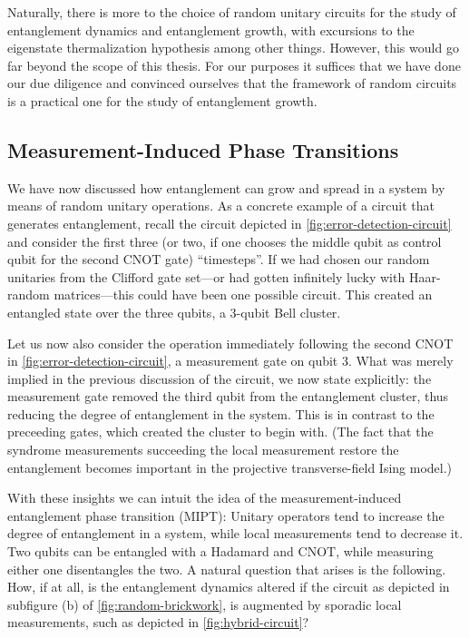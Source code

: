 Naturally, there is more to the choice of random unitary circuits for the study
of entanglement dynamics and entanglement growth, with excursions to the
eigenstate thermalization hypothesis among other things. However, this would go
far beyond the scope of this thesis. For our purposes it suffices that we have
done our due diligence and convinced ourselves that the framework of random
circuits is a practical one for the study of entanglement growth.

\subsection{Measurement-Induced Phase Transitions}\label{sec:mipt}

We have now discussed how entanglement can grow and spread in a system by means
of random unitary operations. As a concrete example of a circuit that generates
entanglement, recall the circuit depicted in
\cref{fig:error-detection-circuit} and consider the first three (or two,
if one chooses the middle qubit as control qubit for the second CNOT gate)
\enquote{timesteps}. If we had chosen our random unitaries from the Clifford
gate set---or had gotten infinitely lucky with Haar-random matrices---this could
have been one possible circuit. This created an entangled state over the three
qubits, a 3-qubit Bell cluster. 

Let us now also consider the operation immediately following the second CNOT in
\cref{fig:error-detection-circuit}, a measurement gate on qubit 3. What was
merely implied in the previous discussion of the circuit, we now state
explicitly: the measurement gate removed the third qubit from the entanglement
cluster, thus reducing the degree of entanglement in the system. This is in
contrast to the preceeding gates, which created the cluster to begin with. (The
fact that the syndrome measurements succeeding the local measurement restore
the entanglement becomes important in the projective transverse-field Ising
model.) 

With these insights we can intuit the idea of the measurement-induced
entanglement phase transition (MIPT): Unitary operators tend to increase the
degree of entanglement in a system, while local measurements tend to decrease
it. Two qubits can be entangled with a Hadamard and CNOT, while measuring
either one disentangles the two. A natural question that arises is the
following. How, if at all, is the entanglement dynamics altered if the circuit
as depicted in subfigure (b) of \cref{fig:random-brickwork}, is augmented by
sporadic local measurements, such as depicted in \cref{fig:hybrid-circuit}?

